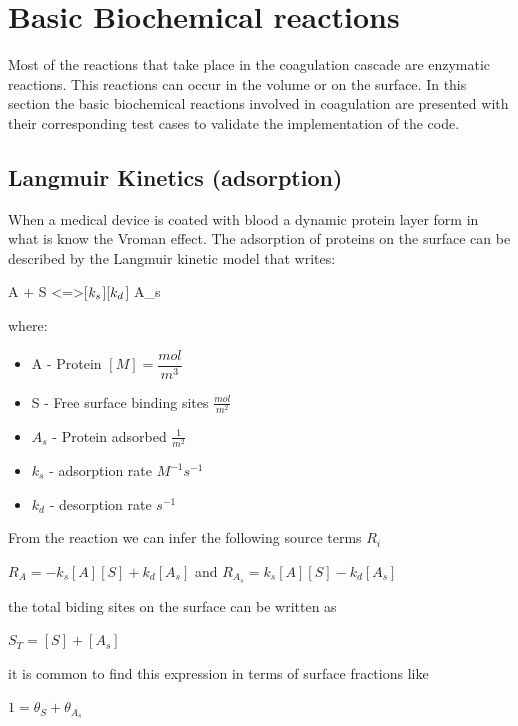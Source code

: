 \documentclass[%
 nofootinbib,
 amsmath,amssymb,
 aps,
 pra,
]{revtex4-1}
\begin{document}
\section{Basic Biochemical reactions}
Most of the reactions that take place in the coagulation cascade are enzymatic reactions. This reactions can occur in the volume or on the surface. In this section the basic biochemical reactions involved in coagulation are presented with their corresponding test cases to validate the implementation of the code.
\subsection{Langmuir Kinetics (adsorption)}
When a medical device is coated with blood a dynamic protein layer form in what is know the Vroman effect. The adsorption of proteins on the surface can be described by the Langmuir kinetic model that writes:
\begin{reaction}
A + S <=>[$k\sb{s}$][$k\sb{d}$] A_s 
\end{reaction}
where:
\begin{itemize}
\item A - Protein  $[M] = \dfrac{mol}{m^{3}}$
\item S - Free surface binding sites $\frac{mol}{m^{2}}$ 
\item $A_s$ - Protein adsorbed $\frac{1}{m^{2}}$
\item $k_s$ - adsorption rate $M^{-1}s^{-1}$
\item $k_d$ - desorption rate $s^{-1}$
\end{itemize}
From the reaction we can infer the following source terms $R_i$
\begin{center}
$R_{A} = -k_s [A] [S] + k_d [A_s] $ and $R_{A_s} = k_s [A] [S] - k_d [A_s] $  
\end{center} 
the total biding sites on the surface can be written as 
\begin{center}
$S_T = [S] + [A_s]$
\end{center}
it is common to find this expression in terms of surface fractions like 
\begin{center}
$1 = \theta_{S} + \theta_{A_s}$
\end{center}
\end{document}
